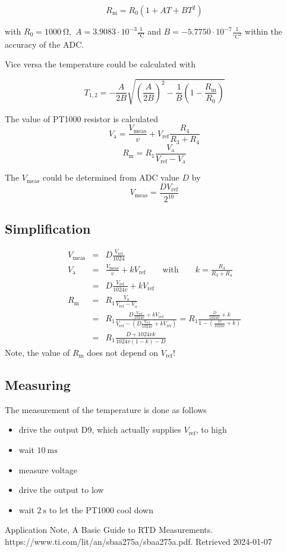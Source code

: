 \documentclass[fontsize=11pt, oneside]{scrartcl}
\newcommand{\F}[2]{{#1}_\mathrm{#2}}
\begin{document}
$$
\F{R}{m} = \F{R}{0} (1 + A T + B T^2)
$$

with $\F{R}{0} = \qty{1000}{\ohm}, $ $A=3.9083\cdot 10^{-3}\frac{1}{\unit{\degreeCelsius}}$ and $B=-5.7750\cdot10^{-7}\frac{1}{\unit{\degreeCelsius}^2}$
within the accuracy of the ADC.

Vice versa the temperature could be calculated with


$$
\F{T}{1,2} = -\frac{A}{2B} \sqrt{\left(\frac{A}{2B}\right)^2 - \frac{1}{B}\left(1 - \frac{\F{R}{m}}{\F{R}{0}} \right)}
$$

The value of PT1000 resistor is calculated
$$
\F{V}{a} = \frac{\F{V}{meas}}{v} + \F{V}{ref} \frac{\F{R}{4}}{\F{R}{3} + \F{R}{4}}
$$
$$
\F{R}{m} = \F{R}{1} \frac{\F{V}{a}}{\F{V}{ref} - \F{V}{a}}
$$

The $\F{V}{meas}$ could be determined from ADC value $D$ by
$$
\F{V}{meas} = \frac{D \F{V}{ref}}{2^{10}}
$$

\subsection*{Simplification}
\begin{eqnarray}
    \F{V}{meas} &=& D \frac{\F{V}{ref}}{1024} \\
    \F{V}{a} &=& \frac{\F{V}{meas}}{v} + k\F{V}{ref} \qquad \mbox{with} \qquad k = \frac{\F{R}{4}}{\F{R}{3} + \F{R}{4}} \\
             &=& D \frac{\F{V}{ref}}{1024 v} + k\F{V}{ref} \\
    \F{R}{m} &=& \F{R}{1} \frac{\F{V}{a}} {\F{V}{ref} - \F{V}{a}} \\
             &=& \F{R}{1} \frac{D \frac{\F{V}{ref}}{1024 v} + k\F{V}{ref}}{\F{V}{ref} - \left(D \frac{\F{V}{ref}}{1024 v} + k\F{V}{ref}\right)} %
              =  \F{R}{1} \frac{\frac{D}{1024 v} + k}{1 - \left(\frac{D}{1024 v} + k\right)} \\
             &=&  \F{R}{1} \frac{D + 1024vk}{1024v\left(1-k\right) - D}
\end{eqnarray}
Note, the value of $\F{R}{m}$ does not depend on $\F{V}{ref}$!


\subsection*{Measuring}

The measurement of the temperature is done as follows
\begin{itemize}
\item drive the output D9, which actually supplies $\F{V}{ref}$, to high
\item wait $\qty{10}{\milli\second}$
\item measure voltage
\item drive the output to low
\item wait $\qty{2}{\second}$ to let the PT1000 cool down
\end{itemize}

\begin{thebibliography}{}
 Application Note, A Basic Guide to RTD Measurements. \\
https://www.ti.com/lit/an/sbaa275a/sbaa275a.pdf. Retrieved 2024-01-07
\end{thebibliography}
\end{document}
